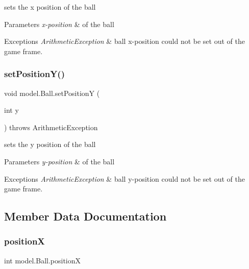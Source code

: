 sets the x position of the ball 


\begin{DoxyParams}{Parameters}
{\em x-\/position} & of the ball \\
\hline
\end{DoxyParams}

\begin{DoxyExceptions}{Exceptions}
{\em Arithmetic\+Exception} & ball x-\/position could not be set out of the game frame. \\
\hline
\end{DoxyExceptions}
\hypertarget{classmodel_1_1_ball_a8902ffdc71a7845ec246fedf586649c7}{}\label{classmodel_1_1_ball_a8902ffdc71a7845ec246fedf586649c7} 
\subsubsection{\texorpdfstring{set\+Position\+Y()}{setPositionY()}}
{\footnotesize\ttfamily void model.\+Ball.\+set\+PositionY (\begin{DoxyParamCaption}\item[{int}]{y }\end{DoxyParamCaption}) throws Arithmetic\+Exception}



sets the y position of the ball 


\begin{DoxyParams}{Parameters}
{\em y-\/position} & of the ball \\
\hline
\end{DoxyParams}

\begin{DoxyExceptions}{Exceptions}
{\em Arithmetic\+Exception} & ball y-\/position could not be set out of the game frame. \\
\hline
\end{DoxyExceptions}


\subsection{Member Data Documentation}
\hypertarget{classmodel_1_1_ball_a706c12dfbaabd03b8423ff2bdde0f5c9}{}\label{classmodel_1_1_ball_a706c12dfbaabd03b8423ff2bdde0f5c9} 
\subsubsection{\texorpdfstring{positionX}{positionX}}
{\footnotesize\ttfamily int model.\+Ball.\+positionX\hspace{0.3cm}{\ttfamily [private]}}

